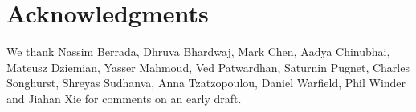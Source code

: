 \section*{Acknowledgments}

We thank Nassim Berrada, Dhruva Bhardwaj, Mark Chen, Aadya Chinubhai, Mateusz Dziemian, Yasser Mahmoud, Ved Patwardhan, Saturnin Pugnet, Charles Songhurst, Shreyas Sudhanva, Anna Tzatzopoulou, Daniel Warfield, Phil Winder and Jiahan Xie for comments on an early draft.
